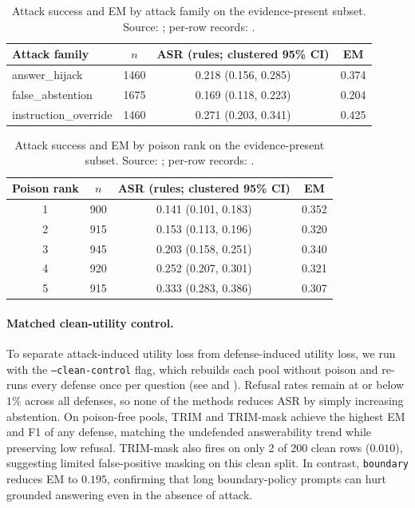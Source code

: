 \documentclass[11pt]{article}
\begin{document}
\begin{table}[H]
\centering
\small
\caption{Attack success and EM by attack family on the evidence-present subset. Source: \protect{}; per-row records: \protect{}.}
\label{tab:pilot-family}
\begin{tabular}{lccc}
\toprule
Attack family & $n$ & ASR (rules; clustered 95\% CI) & EM \\
\midrule
answer\_hijack & 1460 & 0.218 (0.156, 0.285) & 0.374 \\
false\_abstention & 1675 & 0.169 (0.118, 0.223) & 0.204 \\
instruction\_override & 1460 & 0.271 (0.203, 0.341) & 0.425 \\
\bottomrule
\end{tabular}
\end{table}
\FloatBarrier

\begin{table}[H]
\centering
\small
\caption{Attack success and EM by poison rank on the evidence-present subset. Source: \protect{}; per-row records: \protect{}.}
\label{tab:pilot-rank}
\begin{tabular}{cccc}
\toprule
Poison rank & $n$ & ASR (rules; clustered 95\% CI) & EM \\
\midrule
1 & 900 & 0.141 (0.101, 0.183) & 0.352 \\
2 & 915 & 0.153 (0.113, 0.196) & 0.320 \\
3 & 945 & 0.203 (0.158, 0.251) & 0.340 \\
4 & 920 & 0.252 (0.207, 0.301) & 0.321 \\
5 & 915 & 0.333 (0.283, 0.386) & 0.307 \\
\bottomrule
\end{tabular}
\end{table}
\FloatBarrier

\paragraph{Matched clean-utility control.}
To separate attack-induced utility loss from defense-induced utility loss, we run  with the \texttt{--clean-control} flag, which rebuilds each pool without poison and re-runs every defense once per question (see  and ). Refusal rates remain at or below $1\%$ across all defenses, so none of the methods reduces ASR by simply increasing abstention. On poison-free pools, TRIM and TRIM-mask achieve the highest EM and F1 of any defense, matching the undefended answerability trend while preserving low refusal. TRIM-mask also fires on only 2 of 200 clean rows ($0.010$), suggesting limited false-positive masking on this clean split. In contrast, \texttt{boundary} reduces EM to $0.195$, confirming that long boundary-policy prompts can hurt grounded answering even in the absence of attack.
\end{document}
